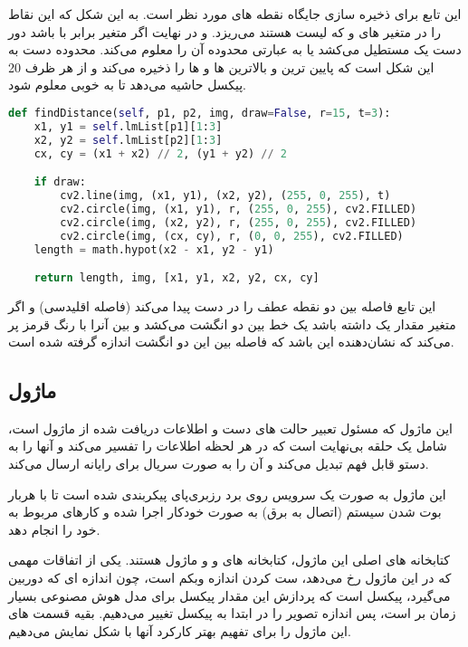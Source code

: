 \documentclass{article}
\begin{document}
این تابع برای ذخیره سازی جایگاه نقطه های مورد نظر است. به این شکل که این نقاط را در متغیر های  و  که لیست هستند می‌ریزد. و در نهایت اگر متغیر  برابر با  باشد دور دست یک مستطیل می‌کشد یا به عبارتی محدوده آن را معلوم می‌کند. محدوده دست به این شکل است که پایین ترین و بالاترین  ها و  ها را ذخیره می‌کند و از هر ظرف 20 پیکسل حاشیه می‌دهد تا به خوبی معلوم شود.

\begin{latin}
\begin{lstlisting}[language=python]
def findDistance(self, p1, p2, img, draw=False, r=15, t=3):
    x1, y1 = self.lmList[p1][1:3]
    x2, y2 = self.lmList[p2][1:3]
    cx, cy = (x1 + x2) // 2, (y1 + y2) // 2

    if draw:
        cv2.line(img, (x1, y1), (x2, y2), (255, 0, 255), t)
        cv2.circle(img, (x1, y1), r, (255, 0, 255), cv2.FILLED)
        cv2.circle(img, (x2, y2), r, (255, 0, 255), cv2.FILLED)
        cv2.circle(img, (cx, cy), r, (0, 0, 255), cv2.FILLED)
    length = math.hypot(x2 - x1, y2 - y1)

    return length, img, [x1, y1, x2, y2, cx, cy]
\end{lstlisting}
\end{latin}

این تابع فاصله بین دو نقطه عطف را در دست پیدا می‌کند (فاصله اقلیدسی) و اگر متغیر 
مقدار یک داشته باشد یک خط بین دو انگشت می‌کشد و بین آنرا با رنگ قرمز پر می‌کند که نشان‌دهنده این باشد که فاصله بین این دو انگشت اندازه گرفته شده است.

\subsection{ماژول }
این ماژول که مسئول تعبیر حالت های دست و اطلاعات دریافت شده از ماژول  است، شامل یک حلقه  بی‌نهایت است که در هر لحظه اطلاعات را تفسیر می‌کند و آنها را به دستو قابل فهم تبدیل می‌کند و آن را به صورت سریال برای رایانه ارسال می‌کند.

این ماژول به صورت یک سرویس روی برد رزبری‌پای پیکربندی شده است تا با هربار بوت شدن سیستم (اتصال به برق) به صورت خودکار اجرا شده و کارهای مربوط به خود را انجام دهد.

کتابخانه های اصلی این ماژول، کتابخانه های  و  و ماژول  هستند. یکی از اتفاقات مهمی که در این ماژول رخ می‌دهد، ست کردن اندازه وبکم است، چون اندازه ای که دوربین می‌گیرد،  پیکسل است که پردازش این مقدار پیکسل برای مدل هوش مصنوعی بسیار زمان بر است، پس اندازه تصویر را در ابتدا به  پیکسل تغییر می‌دهیم. بقیه قسمت های این ماژول را برای تفهیم بهتر کارکرد آنها با شکل نمایش می‌دهیم.
\end{document}
